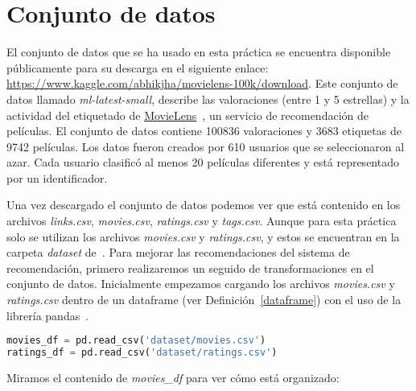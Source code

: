 \documentclass{uimppracticas}
\begin{document}
\section{Conjunto de datos}\label{conjunto_datos}

El conjunto de datos que se ha usado en esta práctica se encuentra disponible públicamente para su descarga en el siguiente enlace: \url{https://www.kaggle.com/abhikjha/movielens-100k/download}. Este conjunto de datos llamado \textit{ml-latest-small}, describe las valoraciones (entre 1 y 5 estrellas) y la actividad del etiquetado de \href{http://movielens.org}{MovieLens}~\cite{MovieLens}, un servicio de recomendación de películas. El conjunto de datos contiene 100836 valoraciones y 3683 etiquetas de 9742 películas. Los datos fueron creados por 610 usuarios que se seleccionaron al azar. Cada usuario clasificó al menos 20 películas diferentes y está representado por un identificador.

Una vez descargado el conjunto de datos podemos ver que está contenido en los archivos \textit{links.csv}, \textit{movies.csv}, \textit{ratings.csv} y \textit{tags.csv}. Aunque para esta práctica solo se utilizan los archivos \textit{movies.csv} y \textit{ratings.csv}, y estos se encuentran en la carpeta \textit{dataset} de~\cite{GitHubRepo}. Para mejorar las recomendaciones del sistema de recomendación, primero realizaremos un seguido de transformaciones en el conjunto de datos. Inicialmente empezamos cargando los archivos \textit{movies.csv} y \textit{ratings.csv} dentro de un dataframe (ver Definición~\ref{dataframe}) con el uso de la librería pandas~\cite{pandas}.

\begin{lstlisting}[language=python]
movies_df = pd.read_csv('dataset/movies.csv')
ratings_df = pd.read_csv('dataset/ratings.csv')
\end{lstlisting}

Miramos el contenido de \textit{movies\_df} para ver cómo está organizado:
\end{document}
